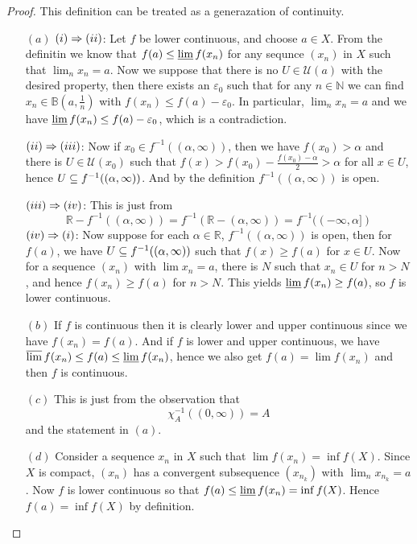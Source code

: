 \begin{proof}This definition can be treated as a generazation of continuity.
\begin{itemize}
\item[$(a)$]
$(\rmnum{1})\Rightarrow(\rmnum{2})$: Let $f$ be lower continuous, and choose $a\in X$. From the definitin we know that $f(a)\leq\varliminf f(x_n)$ for any sequnce $(x_n)$ in $X$ such that $\lim_nx_n=a$. Now we suppose that there is no $U\in\mathcal{U}(a)$ with the desired property, then there exists an $\varepsilon_0$ such that for any $n\in\mathbb{N}$ we can find $x_n\in\mathbb{B}(a,\frac{1}{n})$ with $f(x_n)\leq f(a)-\varepsilon_0$. In particular, $\lim_nx_n=a$ and we have $\varliminf f(x_n)\leq f(a)-\varepsilon_0$, which is a contradiction.\par
$(\rmnum{2})\Rightarrow(\rmnum{3})$: Now if $x_0\in f^{-1}((\alpha,\infty))$, then we have $f(x_0)>\alpha$ and there is $U\in\mathcal{U}(x_0)$ such that $f(x)>f(x_0)-\frac{f(x_0)-\alpha}{2}>\alpha$ for all $x\in U$, hence $U\subseteq f^{-1}((\alpha,\infty))$. And by the definition $f^{-1}((\alpha,\infty))$ is open.\par
$(\rmnum{3})\Rightarrow(\rmnum{4})$: This is just from
\[\mathbb{R}-f^{-1}((\alpha,\infty))=f^{-1}(\mathbb{R}-(\alpha,\infty))=f^{-1}((-\infty,\alpha])\]
$(\rmnum{4})\Rightarrow(\rmnum{1})$: 
Now suppose for each $\alpha\in\mathbb{R}$, $f^{-1}((\alpha,\infty))$ is open, then for $f(a)$, we have $U\subseteq f^{-1}((\alpha,\infty))$ such that $f(x)\geq f(a)$ for $x\in U$. Now for a sequence $(x_n)$ with $\lim x_n=a$, there is $N$ such that $x_n\in U$ for $n>N$, and hence $f(x_n)\geq f(a)$ for $n>N$. This yields $\varliminf f(x_n)\geq f(a)$, so $f$ is lower continuous.
\item[$(b)$] If $f$ is continuous then it is clearly lower and upper continuous since we have $f(x_n)=f(a)$. And if $f$ is lower and upper continuous, we have $\varlimsup f(x_n)\leq f(a)\leq\varliminf f(x_n)$, hence we also get $f(a)=\lim f(x_n)$ and then $f$ is continuous.
\item[$(c)$] This is just from the observation that 
\[\chi_A^{-1}((0,\infty))=A\]
and the statement in $(a)$.
\item[$(d)$] Consider a sequence $x_n$ in $X$ such that $\lim f(x_n)=\inf f(X)$. Since $X$ is compact, $(x_n)$ has a convergent subsequence $(x_{n_k})$ with $\lim_nx_{n_k}=a$. Now $f$ is lower continuous so that $f(a)\leq\varliminf f(x_n)=\inf f(X)$. Hence $f(a)=\inf f(X)$ by definition.
\end{itemize}
\end{proof}
